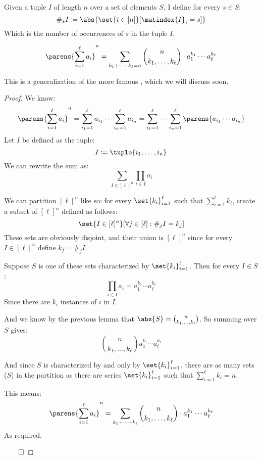 \newpage
\begin{defn*}

	Given a tuple $I$ of length $n$ over a set of elements $S$, I define for every $s\in S$:
	\[ \#_s I\coloneqq\abs{\set{i\in[n]}[\matindex{I}_i=s]} \]
	Which is the number of occurrences of $s$ in the tuple $I$.

\end{defn*}

\begin{thrm*}

	\[ \parens{\sum_{i=1}^\ell a_i}^n = \sum_{k_1+\cdots+k_\ell=n} \binom{n}{k_1,\dots,k_\ell}\cdot a_1^{k_1}\cdots a_\ell^{k_\ell} \]

	This is a generalization of the more famous , which we will discuss soon.

\end{thrm*}

\begin{proof}

	We know:
	\[ \parens{\sum_{i=1}^\ell a_i}^n = \sum_{i_1=1}^\ell a_{i_1} \cdots\sum_{i_n=1}^\ell a_{i_n} =
	\sum_{i_1=1}^\ell\cdots\sum_{i_n=1}^\ell\parens{a_{i_1}\cdots a_{i_n}} \]
	Let $I$ be defined as the tuple:
	\[ I\coloneqq\tuple{i_1,\dots,i_n} \]
	We can rewrite the sum as:
	\[ \sum_{I\in[\ell]^n} \prod_{i\in I} a_i \]

	We can partition $[\ell]^n$ like so: for every $\set{k_i}_{i=1}^\ell$ such that $\sum\limits_{i=1}^\ell k_i$, create a
	subset of $[\ell]^n$ defined as follows:
	\[ \set{I\in[\ell]^n}[\forall j\in[\ell]: \#_j I = k_j] \]
	These sets are obviously disjoint, and their union is $[\ell]^n$ since for every $I\in[\ell]^n$ define $k_j=\#_j I$.

	Suppose $S$ is one of these sets characterized by $\set{k_i}_{i=1}^\ell$. Then for every $I\in S$:
	\[ \prod_{i\in I} a_i = a_1^{k_1}\cdots a_\ell^{k_\ell} \]
	Since there are $k_i$ instances of $i$ in $I$.

	And we know by the previous lemma that $\abs{S}=\binom{n}{k_1,\dots,k_\ell}$. So summing over $S$ gives:
	\[ \binom{n}{k_1,\dots,k_\ell}a_1^{k_1}\cdots a_\ell^{k_\ell} \]
	
	And since $S$ is characterized by and only by $\set{k_i}_{i=1}^\ell$, there are as many sets ($S$) in the partition as
	there are series $\set{k_i}_{i=1}^\ell$ such that $\sum\limits_{i=1}^\ell k_i = n$.

	This means:
	\[ \parens{\sum_{i=1}^\ell a_i}^n = \sum_{k_1+\cdots+k_\ell} \binom{n}{k_1,\dots,k_\ell}\cdot a_1^{k_1}\cdots a_{\ell}^{k_\ell} \]
	As required.

\hfill$\qed$

\end{proof}

